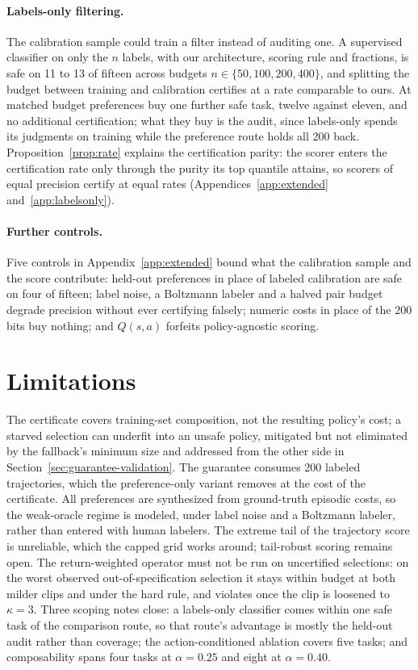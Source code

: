 \documentclass{article} %
\begin{document}
\paragraph{Labels-only filtering.} The calibration sample could train a filter instead of auditing one. A supervised classifier on only the $n$ labels, with our architecture, scoring rule and fractions, is safe on 11 to 13 of fifteen across budgets $n \in \{50, 100, 200, 400\}$, and splitting the budget between training and calibration certifies at a rate comparable to ours. At matched budget preferences buy one further safe task, twelve against eleven, and no additional certification; what they buy is the audit, since labels-only spends its judgments on training while the preference route holds all 200 back. Proposition~\ref{prop:rate} explains the certification parity: the scorer enters the certification rate only through the purity its top quantile attains, so scorers of equal precision certify at equal rates (Appendices~\ref{app:extended} and~\ref{app:labelsonly}).

\paragraph{Further controls.} Five controls in Appendix~\ref{app:extended} bound what the calibration sample and the score contribute: held-out preferences in place of labeled calibration are safe on four of fifteen; label noise, a Boltzmann labeler and a halved pair budget degrade precision without ever certifying falsely; numeric costs in place of the $200$ bits buy nothing; and $Q(s,a)$ forfeits policy-agnostic scoring.

\section{Limitations}
\label{sec:limits}
The certificate covers training-set composition, not the resulting policy's cost; a starved selection can underfit into an unsafe policy, mitigated but not eliminated by the fallback's minimum size and addressed from the other side in Section~\ref{sec:guarantee-validation}. The guarantee consumes 200 labeled trajectories, which the preference-only variant removes at the cost of the certificate. All preferences are synthesized from ground-truth episodic costs, so the weak-oracle regime is modeled, under label noise and a Boltzmann labeler, rather than entered with human labelers. The extreme tail of the trajectory score is unreliable, which the capped grid works around; tail-robust scoring remains open. The return-weighted operator must not be run on uncertified selections: on the worst observed out-of-specification selection it stays within budget at both milder clips and under the hard rule, and violates once the clip is loosened to $\kappa = 3$. Three scoping notes close: a labels-only classifier comes within one safe task of the comparison route, so that route's advantage is mostly the held-out audit rather than coverage; the action-conditioned ablation covers five tasks; and composability spans four tasks at $\alpha = 0.25$ and eight at $\alpha = 0.40$.
\end{document}
